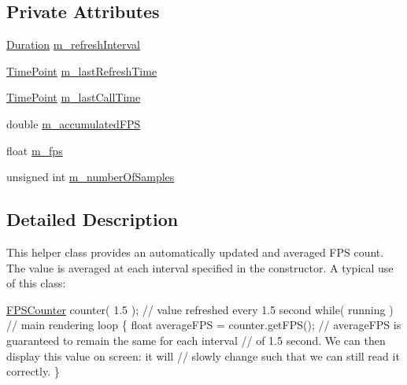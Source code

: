 \subsection*{Private Attributes}
\begin{DoxyCompactItemize}
\item 
\hyperlink{classFPSCounter_a2cb0edfdff687339a681ce0349febe4b}{Duration} \hyperlink{classFPSCounter_a419142db73c011e326309be159419796}{m\+\_\+refresh\+Interval}
\item 
\hyperlink{classFPSCounter_abdab5df998311505d5b39210eb4e4940}{Time\+Point} \hyperlink{classFPSCounter_a1e88f7c01b50ddb5b113ed6cc95335bb}{m\+\_\+last\+Refresh\+Time}
\item 
\hyperlink{classFPSCounter_abdab5df998311505d5b39210eb4e4940}{Time\+Point} \hyperlink{classFPSCounter_a2571dd4fcfa2e6adeeca59088a3481cf}{m\+\_\+last\+Call\+Time}
\item 
double \hyperlink{classFPSCounter_a73c8cd4484bc8d851854f438aca5a2d4}{m\+\_\+accumulated\+F\+P\+S}
\item 
float \hyperlink{classFPSCounter_a29bfe52f7ae0f66958aab30e268e95ed}{m\+\_\+fps}
\item 
unsigned int \hyperlink{classFPSCounter_af985f96020619ec9c94dc1d059f4512d}{m\+\_\+number\+Of\+Samples}
\end{DoxyCompactItemize}


\subsection{Detailed Description}
This helper class provides an automatically updated and averaged F\+P\+S count. The value is averaged at each interval specified in the constructor. A typical use of this class\+: 
\begin{DoxyCode}
\hyperlink{classFPSCounter}{FPSCounter} counter( 1.5 ); \textcolor{comment}{// value refreshed every 1.5 second}
\textcolor{keywordflow}{while}( running ) \textcolor{comment}{// main rendering loop}
\{
  \textcolor{keywordtype}{float} averageFPS = counter.getFPS();
  \textcolor{comment}{// averageFPS is guaranteed to remain the same for each interval}
  \textcolor{comment}{// of 1.5 second. We can then display this value on screen: it will}
  \textcolor{comment}{// slowly change such that we can still read it correctly.}
\}
\end{DoxyCode}
 

